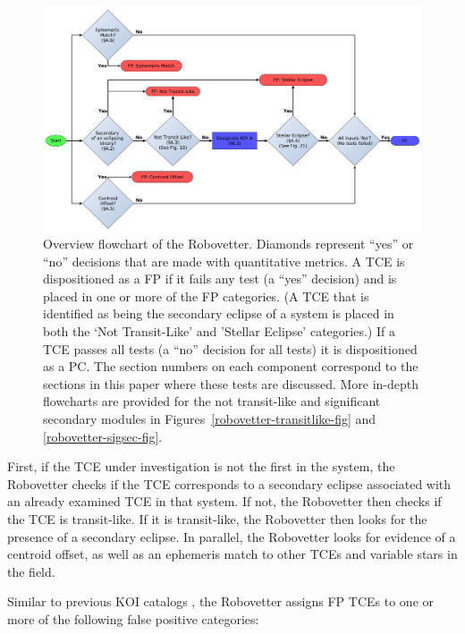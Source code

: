 \begin{figure}[htb]
\centering
\includegraphics[width=\linewidth]{RoboVetter-Diagram-V4-Overview.pdf}
\caption{Overview flowchart of the Robovetter. Diamonds represent ``yes'' or ``no'' decisions that are made with quantitative metrics. A TCE is dispositioned as a FP if it fails any test (a ``yes'' decision) and is placed in one or more of the FP categories. (A TCE that is identified as being the secondary eclipse of a system is placed in both the `Not Transit-Like' and 'Stellar Eclipse' categories.) If a TCE passes all tests (a ``no'' decision for all tests) it is dispositioned as a PC. The section numbers on each component correspond to the sections in this paper where these tests are discussed. More in-depth flowcharts are provided for the not transit-like and significant secondary modules in Figures~\ref{robovetter-transitlike-fig} and \ref{robovetter-sigsec-fig}.}
\label{robovetter-overview-fig}
\end{figure}


First, if the TCE under investigation is not the first in the system, the Robovetter checks if the TCE corresponds to a secondary eclipse associated with an already examined TCE in that system. If not, the Robovetter then checks if the TCE is transit-like. If it is transit-like, the Robovetter then looks for the presence of a secondary eclipse. In parallel, the Robovetter looks for evidence of a centroid offset, as well as an ephemeris match to other TCEs and variable stars in the \kepler{} field. 

\label{s:majorflags}
Similar to previous KOI catalogs \citep{Coughlin2016, Mullally2015cat, Rowe2015cat}, the Robovetter assigns FP TCEs to one or more of the following false positive categories:


